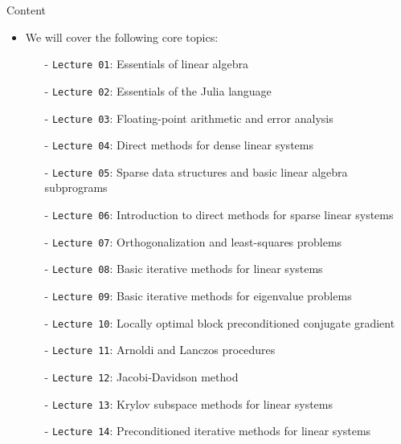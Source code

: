 \documentclass[t,usepdftitle=false]{beamer}
\begin{document}
\begin{frame}{Content}
\begin{itemize}
\vspace{-.1cm}
\item We will cover the following core topics:%
\begin{itemize}
\item[-] \texttt{Lecture 01}: Essentials of linear algebra\vspace{.02cm}
\item[-] \texttt{Lecture 02}: Essentials of the Julia language\vspace{.02cm}
\item[-] \texttt{Lecture 03}: Floating-point arithmetic and error analysis\vspace{.02cm}
\item[-] \texttt{Lecture 04}: Direct methods for dense linear systems\vspace{.02cm}
\item[-] \texttt{Lecture 05}: Sparse data structures and basic linear algebra subprograms\vspace{.02cm}
\item[-] \texttt{Lecture 06}: Introduction to direct methods for sparse linear systems\vspace{.02cm}
\item[-] \texttt{Lecture 07}: Orthogonalization and least-squares problems\vspace{.02cm}
\item[-] \texttt{Lecture 08}: Basic iterative methods for linear systems\vspace{.02cm}
\item[-] \texttt{Lecture 09}: Basic iterative methods for eigenvalue problems\vspace{.02cm}
\item[-] \texttt{Lecture 10}: Locally optimal block preconditioned conjugate gradient\vspace{.02cm}
\item[-] \texttt{Lecture 11}: Arnoldi and Lanczos procedures\vspace{.02cm}
\item[-] \texttt{Lecture 12}: Jacobi-Davidson method\vspace{.02cm}
\item[-] \texttt{Lecture 13}: Krylov subspace methods for linear systems\vspace{.02cm}
\item[-] \texttt{Lecture 14}: Preconditioned iterative methods for linear systems\vspace{.02cm}

\end{itemize}
\end{itemize}
\end{frame}
\end{document}
